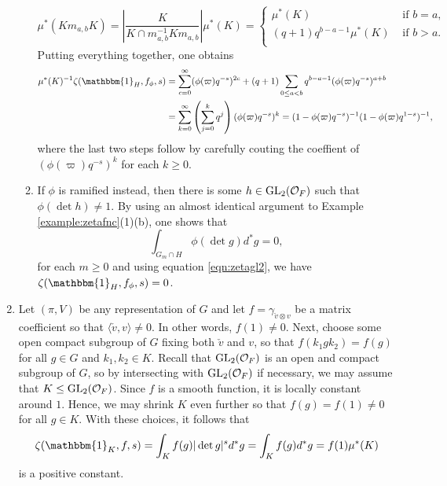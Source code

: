 \begin{example}
\begin{enumerate}[(1)]
\begin{enumerate}
            \[
            \mu^*(Km_{a,b}K)=\left|\frac{K}{K\cap m_{a,b}^{-1}K m_{a,b}}\right|\mu^*(K)=
            \begin{cases}
                \mu^*(K) &\text{ if } b=a,\\
                (q+1)q^{b-a-1}\mu^*(K) &\text{ if } b > a.\\
            \end{cases}
            \]
            Putting everything together, one obtains
            \begin{align*}
                \mu^*(K)^{-1}\zeta(\mathbbm{1}_H,f_\phi,s)&=\sum_{c=0}^{\infty}(\phi(\varpi)q^{-s})^{2c}+(q+1)\sum_{0\leq a< b}q^{b-a-1}(\phi(\varpi)q^{-s})^{a+b}\\
                &=\sum_{k=0}^\infty\left(\sum_{j=0}^k q^j\right)(\phi(\varpi)q^{-s})^k=(1-\phi(\varpi)q^{-s})^{-1}(1-\phi(\varpi)q^{1-s})^{-1},
            \end{align*}
            where the last two steps follow by carefully couting the coeffient of $(\phi(\varpi)q^{-s})^k$ for each $k\geq 0$.
            \item If $\phi$ is ramified instead, then there is some $h\in \mathrm{GL}_2(\mathcal{O}_F)$ such that $\phi(\det h)\neq 1$. By using an almost identical argument to Example \ref{example:zetafnc}(1)(b), one shows that
            $$\int_{G_m\cap H}\phi(\det g)d^*g=0,$$
            for each $m\geq 0$ and using equation \eqref{eqn:zetagl2}, we have $\zeta(\mathbbm{1}_H,f_\phi,s)=0$.
        \end{enumerate} 
        
        \item Let $(\pi,V)$ be any representation of $G$ and let $f=\gamma_{\check{v}\otimes v}$ be a matrix coefficient so that $\langle\check{v},v\rangle\neq 0$. In other words, $f(1)\neq 0$. Next, choose some open compact subgroup of $G$ fixing both $\check{v}$ and $v$, so that $f(k_1gk_2)=f(g)$ for all $g\in G$ and $k_1,k_2\in K$. Recall that $\mathrm{GL}_2(\mathcal{O}_F)$ is an open and compact subgroup of $G$, so by intersecting with $\mathrm{GL}_2(\mathcal{O}_F)$ if necessary, we may assume that $K\leq\mathrm{GL}_2(\mathcal{O}_F)$. Since $f$ is a smooth function, it is locally constant around $1$. Hence, we may shrink $K$ even further so that $f(g)=f(1)\neq0$ for all $g\in K$. With these choices, it follows that 
        $$\zeta(\mathbbm{1}_K,f,s)=\int_{K}f(g)|\det g|^sd^*g=\int_K f(g)d^*g=f(1)\mu^*(K)$$ is a positive constant.
        

    \end{enumerate}
\end{example}

